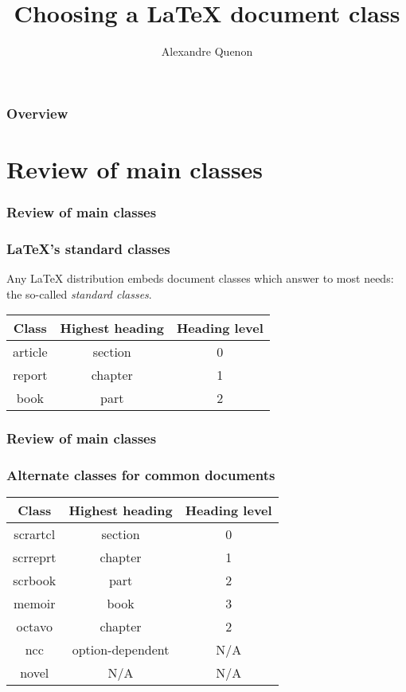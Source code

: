 \documentclass[11pt]{beamer}
\title{Choosing a \LaTeX{} document class}
\author[A. Quenon]{Alexandre Quenon}
\begin{document}
\begin{frame}
	\titlepage
\end{frame}


\begin{frame}
	\frametitle{Overview}
	
	\tableofcontents
\end{frame}


\section{Review of main classes}

\begin{frame}
	\frametitle{Review of main classes}
	\frametitle{\LaTeX{}'s standard classes}

	Any \LaTeX{} distribution embeds document classes which answer to most needs: the so-called \emph{standard classes}.
	
	\begin{table}[h]
		\begin{tabular}{*{3}{c}}
			\toprule
			 Class  & Highest heading & Heading level \\ \midrule
			article &     section     &       0       \\
			report  &     chapter     &       1       \\
			 book   &      part       &       2       \\ \bottomrule
		\end{tabular}
	\end{table}
\end{frame}


\begin{frame}
	\frametitle{Review of main classes}
	\frametitle{Alternate classes for common documents}
	
	
	\begin{table}[h]
		\begin{tabular}{*{3}{c}}
			\toprule
			 Class   & Highest heading  & Heading level \\ \midrule
			scrartcl &     section      &       0       \\
			scrreprt &     chapter      &       1       \\
			scrbook  &       part       &       2       \\
			 memoir  &       book       &       3       \\
			 octavo  &     chapter      &       2       \\
			  ncc    & option-dependent &      N/A      \\
			 novel   &       N/A        &      N/A      \\ \bottomrule
		\end{tabular}
	\end{table}
\end{frame}
\end{document}

